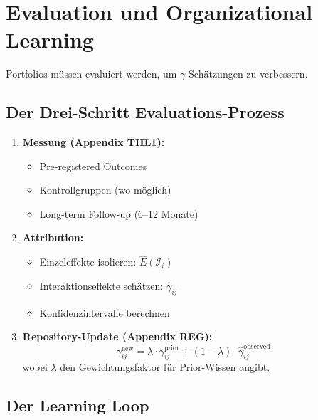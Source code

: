 \section{Evaluation und Organizational Learning}
\label{sec:20-learning}

Portfolios müssen evaluiert werden, um $\gamma$-Schätzungen zu verbessern.

\subsection{Der Drei-Schritt Evaluations-Prozess}

\begin{enumerate}
\item \textbf{Messung (Appendix THL1):}
   \begin{itemize}[nosep]
   \item Pre-registered Outcomes
   \item Kontrollgruppen (wo möglich)
   \item Long-term Follow-up (6--12 Monate)
   \end{itemize}

\item \textbf{Attribution:}
   \begin{itemize}[nosep]
   \item Einzeleffekte isolieren: $\hat{E}(\mathcal{I}_i)$
   \item Interaktionseffekte schätzen: $\hat{\gamma}_{ij}$
   \item Konfidenzintervalle berechnen
   \end{itemize}

\item \textbf{Repository-Update (Appendix REG):}
\begin{equation}
\gamma_{ij}^{\text{new}} = \lambda \cdot \gamma_{ij}^{\text{prior}} + (1-\lambda) \cdot \hat{\gamma}_{ij}^{\text{observed}}
\label{eq:20-bayesian-update}
\end{equation}
wobei $\lambda$ den Gewichtungsfaktor für Prior-Wissen angibt.
\end{enumerate}

\subsection{Der Learning Loop}

